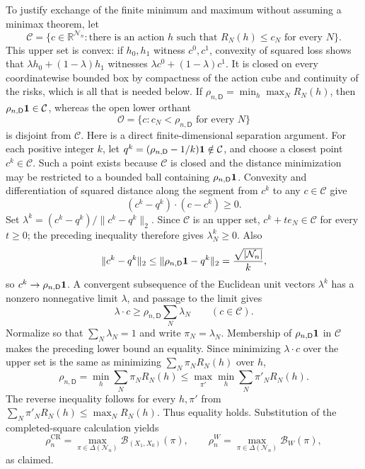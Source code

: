 To justify exchange of the finite minimum and maximum without assuming a minimax theorem, let
\[
 \mathcal C=\{c\in\mathbb R^{\mathcal N_n}:\text{there is an action }h
 \text{ such that }R_N(h)\leq c_N\text{ for every }N\}.
\]
This upper set is convex: if \(h_0,h_1\) witness \(c^0,c^1\), convexity of squared loss shows that \(\lambda h_0+(1-\lambda)h_1\) witnesses \(\lambda c^0+(1-\lambda)c^1\).  It is closed on every coordinatewise bounded box by compactness of the action cube and continuity of the risks, which is all that is needed below.  If \(\rho_{n,\mathsf D}=\min_h\max_NR_N(h)\), then \(\rho_{n,\mathsf D}{\bf1}\in\mathcal C\), whereas the open lower orthant
\[
 \mathcal O=\{c:c_N<\rho_{n,\mathsf D}\text{ for every }N\}
\]
is disjoint from \(\mathcal C\).  Here is a direct finite-dimensional separation argument.  For each positive integer \(k\), let \(q^k=(\rho_{n,\mathsf D}-1/k){\bf1}\notin\mathcal C\), and choose a closest point \(c^k\in\mathcal C\).  Such a point exists because \(\mathcal C\) is closed and the distance minimization may be restricted to a bounded ball containing \(\rho_{n,\mathsf D}{\bf1}\).  Convexity and differentiation of squared distance along the segment from \(c^k\) to any \(c\in\mathcal C\) give
\[
 (c^k-q^k)\mathbin{\cdot}(c-c^k)\geq0.
\]
Set \(\lambda^k=(c^k-q^k)/\lVert c^k-q^k\rVert_2\).  Since \(\mathcal C\) is an upper set, \(c^k+t e_N\in\mathcal C\) for every \(t\geq0\); the preceding inequality therefore gives \(\lambda_N^k\geq0\).  Also
\[
 \lVert c^k-q^k\rVert_2
 \leq\lVert\rho_{n,\mathsf D}{\bf1}-q^k\rVert_2
 =\frac{\sqrt{|\mathcal N_n|}}{k},
\]
so \(c^k\to\rho_{n,\mathsf D}{\bf1}\).  A convergent subsequence of the Euclidean unit vectors \(\lambda^k\) has a nonzero nonnegative limit \(\lambda\), and passage to the limit gives
\[
 \lambda\mathbin{\cdot}c\geq
 \rho_{n,\mathsf D}\sum_N\lambda_N\qquad(c\in\mathcal C).
\]
Normalize so that \(\sum_N\lambda_N=1\) and write \(\pi_N=\lambda_N\).  Membership of \(\rho_{n,\mathsf D}{\bf1}\) in \(\mathcal C\) makes the preceding lower bound an equality.  Since minimizing \(\lambda\mathbin{\cdot}c\) over the upper set is the same as minimizing \(\sum_N\pi_NR_N(h)\) over \(h\),
\[
 \rho_{n,\mathsf D}=\min_h\sum_N\pi_NR_N(h)
 \leq \max_{\pi'}\min_h\sum_N\pi'_NR_N(h).
\]
The reverse inequality follows for every \(h,\pi'\) from
\(
 \sum_N\pi'_NR_N(h)\leq\max_NR_N(h)
\).
Thus equality holds.  Substitution of the completed-square calculation yields
\[
 \rho_n^{\mathrm{CR}}=\max_{\pi\in\Delta(\mathcal N_n)}
 \mathcal B_{(X_1,X_0)}(\pi),\qquad
 \rho_n^W=\max_{\pi\in\Delta(\mathcal N_n)}\mathcal B_W(\pi),
\]
as claimed.

